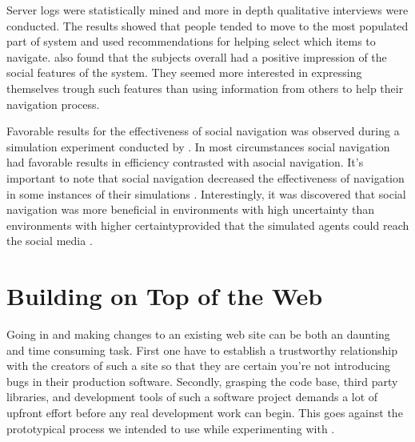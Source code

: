 Server logs were statistically mined and more in depth qualitative interviews
were conducted. The results showed that people tended to move to the most
populated part of system and used recommendations for helping select which
items to navigate. \citeauthor{svensson05} also found that the subjects
overall had a positive impression of the social features of the system. They
seemed more interested in expressing themselves trough such features than
using information from others to help their navigation process.

Favorable results for the effectiveness of social navigation was observed
during a simulation experiment conducted by \citeauthor{riedl03}. In most
circumstances social navigation had favorable results in efficiency contrasted
with asocial navigation. It's important to note that social navigation
decreased the effectiveness of navigation in some instances of their
simulations \citeyearpar[p.~365]{riedl03}.
Interestingly, it was discovered that social navigation was more
beneficial in environments with high uncertainty%
than environments with higher certainty\dash{}provided that the
simulated agents could reach the social media
\citeyearpar[p.~368]{riedl03}. 

\section{Building on Top of the Web}
\label{section:building.on.top.of.the.web}

Going in and making changes to an existing web site can be both an
daunting and time consuming task. First one have to establish a trustworthy
relationship with the creators of such a site so that they are certain
you're not introducing bugs in their production software. Secondly, grasping
the code base, third party libraries, and development tools of such a software
project demands a lot of upfront effort before any real development work can
begin. This goes against the prototypical process we intended to use while
experimenting with \urort.

